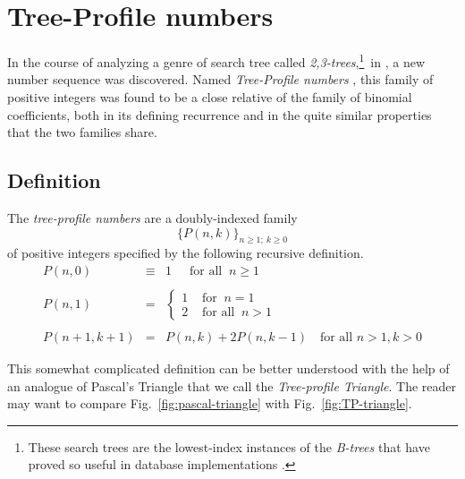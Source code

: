 
\chapter{Tree-Profile numbers}
\label{Appendix:Tree-Profile-numbers}

In the course of analyzing a genre of search tree called {\it
  2,3-trees},\footnote{These search trees are the lowest-index
  instances of the {\it B-trees} that have proved so useful in database
  implementations \cite{CLRS}.}~in \cite{MillerPRS79,RosenbergS78}, a
new number sequence was discovered.
Named {\it Tree-Profile numbers} \cite{Rosenberg79}, this family of
positive integers was found to be a close relative of the family of
binomial coefficients, both in its defining recurrence and in the
quite similar properties that the two families share.

\section{Definition}

The {\it tree-profile numbers} are a doubly-indexed family
\[ \big\{ P(n,k) \big\}_{n \geq 1; \ k \geq 0}  \]
of positive integers specified by the following recursive definition.
\begin{equation}
\label{eq:TP-defn}
\begin{array}{ccl}
P(n,0) & \equiv & 1 \ \ \ \ \ \mbox{ for all } \ n \geq 1 \\
  & & \\
P(n,1) & = &
  {\displaystyle
\left\{
\begin{array}{cl}
 1 & \mbox{ for } \ n=1 \\
 2 & \mbox{ for all } \ n > 1
\end{array}
\right.  } \\
  & & \\
P(n+1, k+1) & = & P(n,k) + 2 P(n, k-1) \ \ \  \mbox{ for all } n > 1, k > 0
\end{array}
\end{equation}

This somewhat complicated definition can be better understood with the
help of an analogue of Pascal's Triangle that we call the {\it
  Tree-profile Triangle}.  The reader may want to compare
Fig.~\ref{fig:pascal-triangle} with Fig.~\ref{fig:TP-triangle}.

